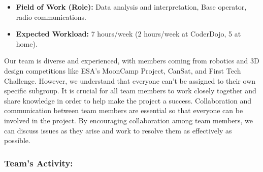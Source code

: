 \documentclass[11pt]{article}
\begin{document}
\begin{itemize}
\begin{itemize}[label=]
        \item[\faMicroscope] \textbf{Field of Work (Role):} Data analysis and interpretation,  Base operator, radio communications.
        \item[\faLaptopCode] \textbf{Expected Workload:} 7 hours/week (2 hours/week at CoderDojo, 5 at home).
    \end{itemize}
\end{itemize}

Our team is diverse and experienced, with members coming from robotics and 3D design competitions like ESA’s MoonCamp Project, CanSat, and First Tech Challenge. However, we understand that everyone can’t be assigned to their own specific subgroup. It is crucial for all team members to work closely together and share knowledge in order to help make the project a success. Collaboration and communication between team members are essential so that everyone can be involved in the project. By encouraging collaboration among team members, we can discuss issues as they arise and work to resolve them as effectively as possible.

\subsubsection{Team's Activity:} 
\end{document}

